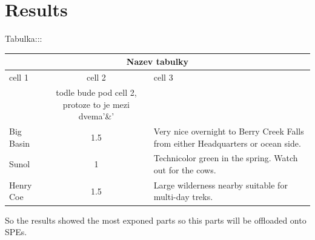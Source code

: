 \chapter{Results}
Tabulka:::
\begin{center}
\begin{tabular}{|l|c|p{3.5in}|}
\hline
\multicolumn{3}{|c|}{Nazev tabulky}\\ 
\hline cell 1&cell 2&cell 3\\&todle bude pod cell 2, protoze to je mezi dvema'\&' &\\ 
\hline Big Basin&1.5&Very nice overnight to Berry Creek Falls from
either Headquarters or ocean side.\\ 
\hline Sunol&1&Technicolor green in the spring. Watch out for the cows.\\ 
\hline Henry Coe&1.5&Large wilderness nearby suitable for multi-day treks.\\ 
\hline
\end{tabular}
\end{center}

So the results showed the most exponed parts so this parts will be offloaded onto SPEs.